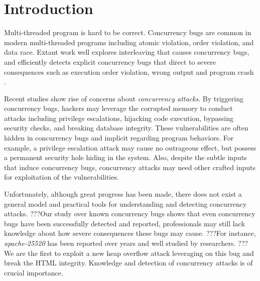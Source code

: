 \section{Introduction} \label{sec:intro}


Multi-threaded program is hard to be correct. 
Concurrency bugs are common in modern multi-threaded programs  
including atomic violation, order violation, and data race\cite{lu:concurrency-bugs,conmem:asplos10,conseq:asplos11, lu:muvi:sosp}.
Extant work well explores interleaving that causes concurrency bugs, 
and efficiently detects explicit concurrency bugs that direct to  
severe consequences such as execution order violation, wrong output and program crash
\cite{wu2015:collaborative,tsan,valgrind:pldi,lu:muvi:sosp,conseq:asplos11,conmem:asplos10}.

Recent studies\cite{acidrain:sigmod17,con:hotpar12} show rise of concerns about \emph{concurrency attacks}.
By triggering concurrency bugs, 
hackers may leverage the corrupted memory to conduct  
attacks including privilege escalations\cite{uselib-bug-12791,mysql-bug-14747}, hijacking code execution\cite{msiexploit}, bypassing security checks\cite{cve-2008-0034,cve-2010-0923,cve-2010-1754}, 
and breaking database integrity\cite{acidrain:sigmod17}.
These vulnerabilities are often hidden in concurrency bugs and implicit regarding program behaviors. 
For example, a privilege escalation attack may cause no outrageous effect, 
but possess a permanent security hole hiding in the system.
Also, despite the subtle inputs that induce concurrency bugs, 
concurrency attacks may need other crafted inputs for exploitation of the vulnerabilities. 



Unfortunately, although great progress has been made, there does not exist a general model and practical tools  
for understanding and detecting concurrency attacks.
???Our study over known concurrency 
bugs\cite{apache-bug-25520, apache-bug-46215} shows that 
even concurrency bugs have been successfully detected and reported, 
professionals may still lack knowledge about how severe consequences these bugs may cause. 
???For instance, \emph{apache-25520}\cite{apache-bug-25520} has been 
reported over years and well studied by researchers\cite{lu:concurrency-bugs}.  
???We are the first to exploit a new heap overflow attack leveraging on this bug and break the HTML integrity. 
Knowledge and detection of concurrency attacks is of crucial importance. 

